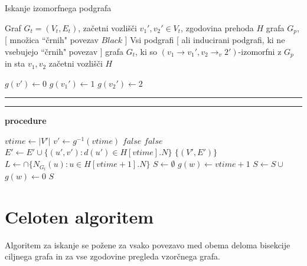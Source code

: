\documentclass[a4paper, 12pt, ]{book}
\newcommand\Subalg[1]{%
	\Statex%
	\vspace*{-.7\baselineskip}%
	\hspace*{\dimexpr-\algorithmicindent-4pt\relax}%
	\rule{\textwidth}{0.4pt}%
	\Statex%
	
	\vspace*{-.7\baselineskip}%
	\Statex\hspace*{\dimexpr-\algorithmicindent-2pt\relax}%
	\rule{\textwidth}{0.4pt}%
	
	\Statex\hspace*{-\algorithmicindent}\textbf{procedure} #1%
}
\begin{document}
\begin{algorithm}
\caption{Iskanje izomorfnega podgrafa}
\label{alg:sub_st}
\begin{algorithmic}[1]
	\Require Graf $G_t = (V_t, E_t)$, začetni vozlišči $v_1', v_2' \in V_t$, zgodovina prehoda $H$ grafa $G_p$, [ množica ``črnih" povezav $Black$ ]
	\Ensure Vsi podgrafi [ ali inducirani podgrafi, ki ne vsebujejo ``črnih" povezav ] grafa $G_t$, ki so $(v_1 \to v_1', v_2 \to _v2')$-izomorfni z
	 $G_p$ in sta $v_1, v_2$ začetni vozlišči $H$
	 
	 		\label{line:st1}
	 	\State $g(v') \gets 0$
	\EndFor
	\State $g(v_1') \gets 1$
	\State $g(v_2') \gets 2$	\label{line:st4}
	\State \Return {}	\label{line:st5}

	
	\Subalg{}
	\State $vtime \gets |V'|$				\label{line:st6}
	\State $v' \gets g^{-1}(vtime)$			\label{line:st7}
		\label{line:st8}
		\State \Return $false$	
	\EndIf
	\If {[ $H[vtime].N \not = \{ g(u') > 0: (v', u') \in E \}$ \textbf{or} $H[vtime].l \not = l(v')$ ]}		\label{line:st10}
		\State \Return $false$	
	\EndIf
	\State $E' \gets E' \cup \{ (u', v'): d(u') \in H[vtime].N \}$	\label{line:st12}
		\Return $\{ (V', E') \}$		\label{line:st13}
	\EndIf
	\State $L \gets \cap \{ N_{G_t}(u): u \in H[vtime + 1].N \}$	\label{line:st14}
	\State $S \gets \emptyset$		\label{line:st15}
					\label{line:st17}
			\State $g(w) \gets vtime + 1$								\label{line:st18}
			\State $S \gets S \cup$ 	\label{line:st19}
			\State $g(w) \gets 0$									\label{line:st20}
		\EndIf
	\EndFor
	\State \Return $S$
\end{algorithmic}
\end{algorithm}
	



	\section {Celoten algoritem}
	\label{sub:subsea}
	Algoritem za iskanje se požene za vsako povezavo 
	med obema deloma bisekcije ciljnega grafa in za vse zgodovine pregleda vzorčnega grafa. 
\end{document}
